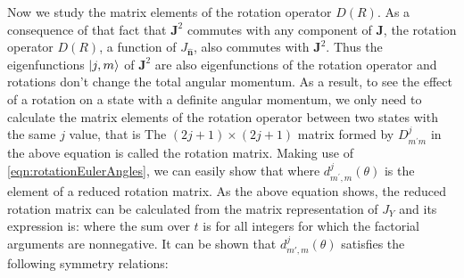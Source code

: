 Now we study the 
matrix elements of the rotation operator $D(R)$. As a consequence of that fact that $\mathbf{J}^2$ commutes with 
any component of $\mathbf{J}$,  the rotation operator $D(R)$, a function of $J_{\mathbf{\hat{n}}}$, also commutes
with $\mathbf{J}^2$. Thus the eigenfunctions $| j, m \rangle$ of $\mathbf{J}^2$ are also eigenfunctions of the rotation
operator and rotations don't change the total angular momentum. 
As a result, to see the effect of a rotation on a state with a definite angular momentum, we only need to calculate the
 matrix elements of the rotation operator between two states with the same $j$ value, that is
The $(2 j + 1) \times (2 j + 1)$ matrix formed by $D^{j}_{m^{\prime} m}$ in the above equation is called the rotation
matrix.  Making use of \autoref{eqn:rotationEulerAngles}, we can easily show that
where $d^j_{m^{\prime}, m}(\theta)$ is the element of a reduced rotation matrix. As the above equation shows, the
reduced rotation matrix can be calculated from the matrix representation of $J_Y$ and  its 
expression is\cite{zare-book}:
where the sum over $t$ is for all integers for which the factorial arguments are nonnegative. It can be shown that  $d^j_{m', m}(\theta)$
satisfies the following symmetry relations\cite{zare-book}:

